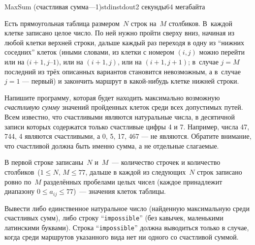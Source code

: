 \begin{problem}{MaxSum (счастливая сумма---1)}{stdin}{stdout}{2 секунды}{64 мегабайта}

Есть прямоугольная таблица размером~$N$ строк на~$M$ столбиков. 
В~каждой клетке записано целое число. По ней нужно пройти сверху вниз, 
начиная из любой клетки верхней строки, дальше каждый
раз переходя в одну из ``нижних соседних'' клеток 
(иными словами, из клетки с номером $(i,j)$ можно
перейти или на $(i+1, j$--$1)$, или на $(i+1,j)$, или на $(i+1,j+1)$;
в~случае $j=M$ последний из трёх описанных вариантов становится невозможным, 
а в~случае $j=1$ --- первый) 
и закончить маршрут в какой-нибудь клетке нижней строки.

Напишите программу, которая будет находить максимально возможную \emph{счастливую сумму} значений
пройденных клеток среди всех допустимых путей. Всем известно, что счастливыми являются натуральные числа, в десятичной записи которых содержатся только счастливые цифры 4 и 7. Например, числа 47, 744, 4 являются счастливыми, а 0, 5, 17, 467 --- не являются. Обратите внимание, что счастливой должна быть именно сумма, а не отдельные слагаемые.

\InputFile
В первой строке записаны~$N$ и~$M$~--- количество строчек и количество столбиков~($1\leqslant N,\,M\leqslant 77$,
дальше в каждой из следующих~$N$ строк записано ровно по~$M$
разделённых пробелами целых чисел (каждое принадлежит диапазону $0\leqslant a_{ij}\leqslant 77$)~--- значения клеток таблицы.


\OutputFile
Вывести либо единственное натуральное число (найденную максимальную среди счастливых сумм), либо строку ``\texttt{impossible}'' (без кавычек, маленькими латинскими буквами). Строка ``\texttt{impossible}'' должна выводиться только в случае, когда среди маршрутов указанного вида нет ни одного со счастливой суммой.

\Examples

\begin{example}
%
\end{example}

\end{problem}
